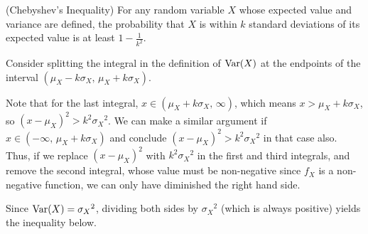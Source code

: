 \begin{thm}(Chebyshev's Inequality)\label{ChebyshevsInequality} For any random variable $X$ whose expected value and variance are defined, the probability that $X$ is within $k$ standard deviations of its expected value is at least $1-\frac{1}{k^2}$. 
\end{thm}
\begin{pf} Consider splitting the integral in the definition of $\operatorname{Var}(X)$ at the endpoints of the interval $(\mu_X - k\sigma_X, \, \mu_X + k\sigma_X)$.
\par
\noindent Note that for the last integral, $x \in (\mu_X + k\sigma_X, \,\infty)$, which means $x > \mu_X + k\sigma_X$, so $(x - \mu_X)^2 > k^2{\sigma_X}^2$. We can make a similar argument if $x \in (-\infty,\, \mu_X + k\sigma_X)$ and conclude $(x - \mu_X)^2 > k^2{\sigma_X}^2$ in that case also. Thus, if we replace $(x-\mu_X)^2$ with $k^2{\sigma_X}^2$ in the first and third integrals, and remove the second integral, whose value must be non-negative since $f_X$ is a non-negative function, we can only have diminished the right hand side.
\par
\noindent Since $\operatorname{Var}(X)={\sigma_X}^2$, dividing both sides by ${\sigma_X}^2$ (which is always positive) yields the inequality below.
\end{pf}

